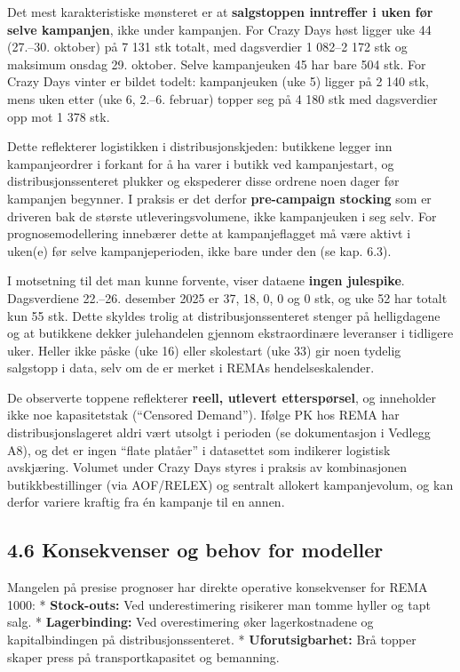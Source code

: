 \documentclass[
  norsk,
  11pt,
  a4paper,
]{article}
\begin{document}
Det mest karakteristiske mønsteret er at \textbf{salgstoppen inntreffer
i uken før selve kampanjen}, ikke under kampanjen. For Crazy Days høst
ligger uke 44 (27.--30. oktober) på 7 131 stk totalt, med dagsverdier 1
082--2 172 stk og maksimum onsdag 29. oktober. Selve kampanjeuken 45 har
bare 504 stk. For Crazy Days vinter er bildet todelt: kampanjeuken (uke
5) ligger på 2 140 stk, mens uken etter (uke 6, 2.--6. februar) topper
seg på 4 180 stk med dagsverdier opp mot 1 378 stk.

Dette reflekterer logistikken i distribusjonskjeden: butikkene legger
inn kampanjeordrer i forkant for å ha varer i butikk ved kampanjestart,
og distribusjonssenteret plukker og ekspederer disse ordrene noen dager
før kampanjen begynner. I praksis er det derfor \textbf{pre-campaign
stocking} som er driveren bak de største utleveringsvolumene, ikke
kampanjeuken i seg selv. For prognosemodellering innebærer dette at
kampanjeflagget må være aktivt i uken(e) før selve kampanjeperioden,
ikke bare under den (se kap. 6.3).

I motsetning til det man kunne forvente, viser dataene \textbf{ingen
julespike}. Dagsverdiene 22.--26. desember 2025 er 37, 18, 0, 0 og 0
stk, og uke 52 har totalt kun 55 stk. Dette skyldes trolig at
distribusjonssenteret stenger på helligdagene og at butikkene dekker
julehandelen gjennom ekstraordinære leveranser i tidligere uker. Heller
ikke påske (uke 16) eller skolestart (uke 33) gir noen tydelig salgstopp
i data, selv om de er merket i REMAs hendelseskalender.

De observerte toppene reflekterer \textbf{reell, utlevert etterspørsel},
og inneholder ikke noe kapasitetstak (``Censored Demand''). Ifølge PK
hos REMA har distribusjonslageret aldri vært utsolgt i perioden (se
dokumentasjon i Vedlegg A8), og det er ingen ``flate platåer'' i
datasettet som indikerer logistisk avskjæring. Volumet under Crazy Days
styres i praksis av kombinasjonen butikkbestillinger (via AOF/RELEX) og
sentralt allokert kampanjevolum, og kan derfor variere kraftig fra én
kampanje til en annen.

\subsection{4.6 Konsekvenser og behov for
modeller}\label{konsekvenser-og-behov-for-modeller}

Mangelen på presise prognoser har direkte operative konsekvenser for
REMA 1000: * \textbf{Stock-outs:} Ved underestimering risikerer man
tomme hyller og tapt salg. * \textbf{Lagerbinding:} Ved overestimering
øker lagerkostnadene og kapitalbindingen på distribusjonssenteret. *
\textbf{Uforutsigbarhet:} Brå topper skaper press på transportkapasitet
og bemanning.
\end{document}
